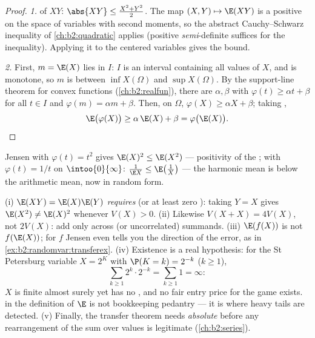 \begin{proof}
\emph{1.}  of $XY$: $\abs{XY} \leq \frac{X^2 + Y^2}2$.
The map $(X, Y) \mapsto \E(XY)$ is a positive  on the space of variables with second moments, so the abstract
Cauchy--Schwarz inequality of \cref{ch:b2:quadratic} applies
(positive \emph{semi}-definite suffices for the inequality).
Applying it to the centered variables gives the  bound.

\emph{2.} First, $m = \E(X)$ lies in $I$: $I$ is an interval
containing all values of $X$, and  is monotone, so $m$
is between $\inf X(\Omega)$ and $\sup X(\Omega)$. By the
support-line theorem for convex functions
(\cref{ch:b2:realfun}), there are $\alpha, \beta$ with
$\varphi(t) \geq \alpha t + \beta$ for all $t \in I$ and
$\varphi(m) = \alpha m + \beta$. Then,  on $\Omega$,
$\varphi(X) \geq \alpha X + \beta$; taking ,
\[
\E\bigl(\varphi(X)\bigr) \geq \alpha\,\E(X) + \beta
= \varphi\bigl(\E(X)\bigr). \qedhere
\]
\end{proof}

\begin{example}
Jensen with $\varphi(t) = t^2$ gives $\E(X)^2 \leq \E(X^2)$ ---
positivity of the ; with $\varphi(t) = 1/t$ on
$\intoo{0}{\infty}$: $\frac{1}{\E X} \leq \E\bigl(\frac1X\bigr)$
--- the harmonic mean is below the arithmetic mean, now in random
form.
\end{example}

\begin{remark}
(i) $\E(XY) = \E(X)\E(Y)$ \emph{requires}  (or at
least zero ): taking $Y = X$ gives $\E(X^2) \neq
\E(X)^2$ whenever $V(X) > 0$. (ii) Likewise $V(X + X) =
4V(X)$, not $2V(X)$:  add only across 
(or uncorrelated) summands. (iii) $\E(f(X))$ is not
$f(\E(X))$; for  $f$ Jensen even tells you the
direction of the error, as in
\cref{ex:b2:randomvar:transferex}. (iv) Existence is a real
hypothesis: for the St Petersburg variable $X = 2^K$ with
$\P(K = k) = 2^{-k}$ ($k \geq 1$),
\[
\sum_{k\geq1}2^k\cdot2^{-k} = \sum_{k\geq1}1 = \infty :
\]
$X$ is finite almost surely yet has no , and no
fair entry price for the game exists.  in the
definition of $\E$ is not bookkeeping pedantry --- it is
where heavy tails are detected. (v) Finally, the transfer
theorem needs \emph{absolute}  before any
rearrangement of the sum over values is legitimate
(\cref{ch:b2:series}).
\end{remark}


